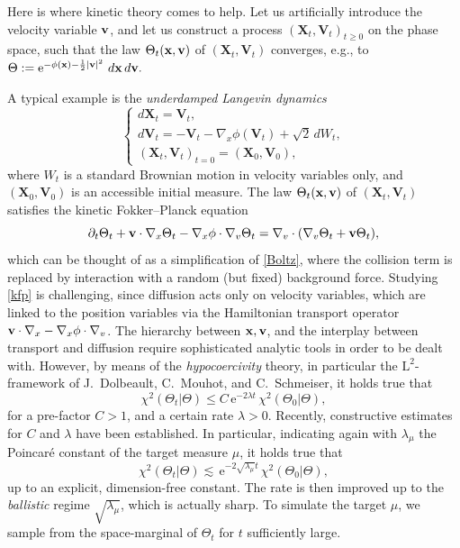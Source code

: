 \documentclass{article}
\newcommand{\bv}{\mathrm{BV}}
\renewcommand{\leq}{\leqslant}
\renewcommand{\geq}{\geqslant}
\def\bx{{\bf x}}
\def\bv{{\bf v}}
\begin{document}
Here is where kinetic theory comes to help\cite{Lei2016}. Let us artificially introduce the velocity variable $\bv$, and let us construct a process $(\mathbf{X}_t,\mathbf{V}_t)_{t\geq 0}$ on the phase space, such that the law $\Theta_t(\bx,\bv)$ of $(\mathbf{X}_t,\mathbf{V}_t)$ converges, e.g., to $\Theta := \mathrm{e}^{-\phi(\bx) - \frac{1}{2}|\bv|^2} \, \,d\bx\,d\bv.$

A typical example is the \emph{underdamped Langevin dynamics}
\begin{equation}\label{ulangevin}
\begin{cases}
    d\mathbf{X}_t = \mathbf{V}_t, \\
    d\mathbf V_t = - \mathbf V_t - \nabla_x \phi(\mathbf V_t) + \sqrt{2}\,dW_t, \\
    (\mathbf{X}_t,\mathbf{V}_t)_{t=0} = (\mathbf X_0,\mathbf V_0),
\end{cases}    
\end{equation}
where $W_t$ is a standard Brownian motion in velocity variables only, and $(\mathbf X_0,\mathbf V_0)$ is an accessible initial measure. 
The law $\Theta_t(\bx,\bv)$ of $ (\mathbf X_t,\mathbf V_t)$ satisfies the kinetic Fokker--Planck equation
\begin{equation}
    \label{kfp}
    \partial_t \Theta_t + \bv \cdot \nabla_x \Theta_t - \nabla_x \phi \cdot \nabla_v \Theta_t = \nabla_v \cdot (\nabla_v \Theta_t + \bv\Theta_t),
\end{equation}
which can be thought of as a simplification of \eqref{Boltz}, where the collision term is replaced by interaction with a random (but fixed) background force. 
Studying \eqref{kfp} is challenging, since diffusion acts only on velocity variables, which are linked to the position variables via the Hamiltonian transport operator $\bv\cdot\nabla_x - \nabla_x \phi \cdot \nabla_v$. The hierarchy between $\bx,\bv$, and the interplay between transport and diffusion require sophisticated analytic tools in order to be dealt with.
However, by means of the \emph{hypocoercivity} theory\cite{Villani}, in particular the $\mathrm{L}^2$-framework of J.~Dolbeault, C.~Mouhot, and C.~Schmeiser\cite{Dolbeault}, it holds true that
\begin{equation}\label{chi3}
\chi^2(\Theta_t|\Theta) \leq C\, \mathrm{e}^{-2 \lambda t} \, \chi^2(\Theta_0|\Theta),
\end{equation}
for a pre-factor $C>1$, and a certain rate $\lambda>0$. Recently\cite{Cao,Brigati,BrigatiLifts,BrigatiPoincare}, constructive estimates for $C$ and $\lambda$ have been established. In particular, indicating again with $\lambda_\mu$ the Poincar\'e constant of the target measure $\mu$, it holds true that 
\[
\chi^2(\Theta_t|\Theta) \lesssim\, \mathrm{e}^{-2 \sqrt{\lambda_\mu} t} \, \chi^2(\Theta_0|\Theta),
\]
up to an explicit, dimension-free constant. 
The rate is then improved up to the \emph{ballistic} regime $\sqrt{\lambda_\mu}$, which is actually sharp.\cite{Eberle} To simulate the target $\mu$, we sample from the space-marginal of $\Theta_t$ for $t$ sufficiently large. 
\end{document}
